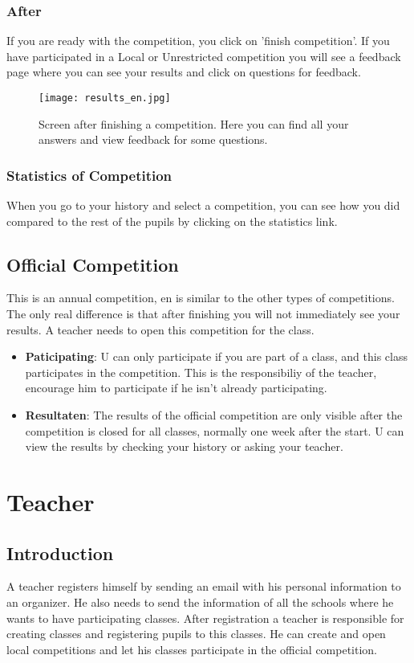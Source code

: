 \documentclass[11pt,a4paper]{report}
\begin{document}
\subsection{After}
If you are ready with the competition, you click on 'finish competition'. If you have participated in a Local or Unrestricted competition you will see a feedback page where you can see your results and click on questions for feedback. 

\begin{figure}[h!]
\centering
\texttt{[image: results\_en.jpg]}
\caption{Screen after finishing a competition. Here you can find all your answers and view feedback for some questions.}
\label{fig:results}
\end{figure}

\subsection{Statistics of Competition}
When you go to your history and select a competition, you can see how you did compared to the rest of the pupils by clicking on the statistics link. 

\section{Official Competition}
This is an annual competition, en is similar to the other types of competitions. The only real difference is that after finishing you will not immediately see your results. A teacher needs to open this competition for the class.
\begin{itemize}
  \item \textbf{Paticipating}: U can only participate if you are part of a class, and this class participates in the competition. This is the responsibiliy of the teacher, encourage him to participate if he isn't already participating.
	\item \textbf{Resultaten}:  The results of the official competition are only visible after the competition is closed for all classes, normally one week after the start. U can view the results by checking your history or asking your teacher.
\end{itemize}


\chapter{Teacher}

\section{Introduction}
A teacher registers himself by sending an email with his personal information to an organizer. He also needs to send the information of all the schools where he wants to have participating classes. After registration a teacher is responsible for creating classes and registering pupils to this classes. He can create and open local competitions and let his classes participate in the official competition.
\end{document}
